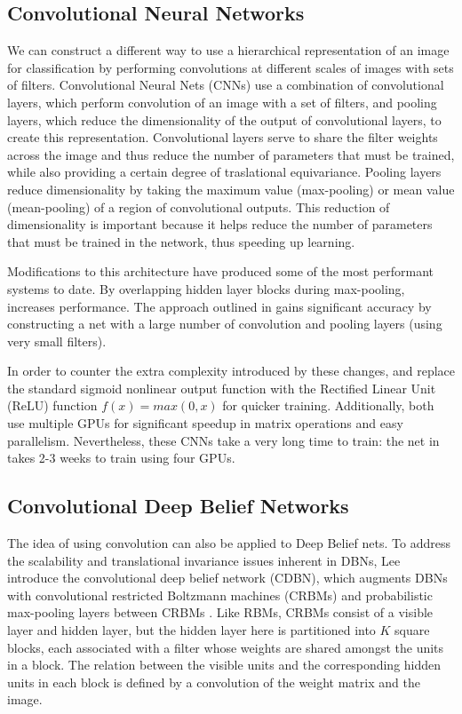 \documentclass[10pt,twocolumn,letterpaper]{article}
\begin{document}
\subsection{Convolutional Neural Networks}

We can construct a different way to use a hierarchical representation of an image for classification
by performing convolutions at different scales of images with sets of filters.
Convolutional Neural Nets (CNNs) use a combination of convolutional layers, which perform convolution
of an image with a set of filters, and pooling layers, which reduce the dimensionality of the output
of convolutional layers, to create this representation. Convolutional layers serve to share the filter weights
across the image and thus reduce the number of parameters that must be trained, while also providing
a certain degree of traslational equivariance.
Pooling layers reduce dimensionality by taking the maximum value (max-pooling) or mean value
(mean-pooling) of a region of convolutional outputs.
This reduction of dimensionality is important because it helps reduce the number of parameters that
must be trained in the network, thus speeding up learning.

Modifications to this architecture \cite{CDBN} have produced some of the most performant
systems to date.
By overlapping hidden layer blocks during max-pooling, \cite{ImageNet} increases performance.
The approach outlined in \cite{Verydeep} gains significant accuracy by constructing a net with
a large number of convolution and pooling layers (using very small filters).

In order to counter the extra complexity introduced by these changes,
\cite{ImageNet} and \cite{Verydeep} replace the standard sigmoid nonlinear output function with the
Rectified Linear Unit (ReLU) function $f(x) = max(0, x)$ for quicker training.
Additionally, both use multiple GPUs for significant speedup in matrix operations
and easy parallelism.
Nevertheless, these CNNs take a very long time to train: the net in \cite{Verydeep}
takes 2-3 weeks to train using four GPUs.

\subsection{Convolutional Deep Belief Networks}

The idea of using convolution can also be applied to Deep Belief nets.
To address the scalability and translational invariance issues inherent in DBNs,
Lee \etal introduce the convolutional deep belief network (CDBN),
which augments DBNs with convolutional restricted Boltzmann machines (CRBMs)
and probabilistic max-pooling layers between CRBMs \cite{CDBN}.
Like RBMs, CRBMs consist of a visible layer and hidden layer, but the hidden
layer here is partitioned into $K$ square blocks, each associated with a filter
whose weights are shared amongst the units in a block.
The relation between the visible units and the corresponding hidden units in each
block is defined by a convolution of the weight matrix and the image.
\end{document}
